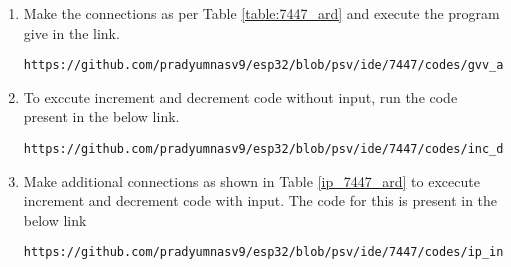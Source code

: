 \begin{enumerate}
\item Make the connections as per Table \ref{table:7447_ard}  and execute the program give in the link.
\begin{lstlisting}
https://github.com/pradyumnasv9/esp32/blob/psv/ide/7447/codes/gvv_ard_7447.ino
\end{lstlisting}
\begin{table}[H]
\centering

\caption{}
\label{table:7447_ard}
\end{table}
\item To exccute increment and decrement code without input, run the code present in the below link.
\begin{lstlisting}
https://github.com/pradyumnasv9/esp32/blob/psv/ide/7447/codes/inc_dec.ino
\end{lstlisting}
\item Make additional connections as shown in Table \ref{ip_7447_ard} to excecute increment and decrement code with input. The code for this is present in the below link
\begin{lstlisting}
https://github.com/pradyumnasv9/esp32/blob/psv/ide/7447/codes/ip_inc_dec.ino
\end{lstlisting}
\begin{table}[H]
\centering

\caption{}
\label{table:ip_7447_ard}
\end{table}
\end{enumerate}
